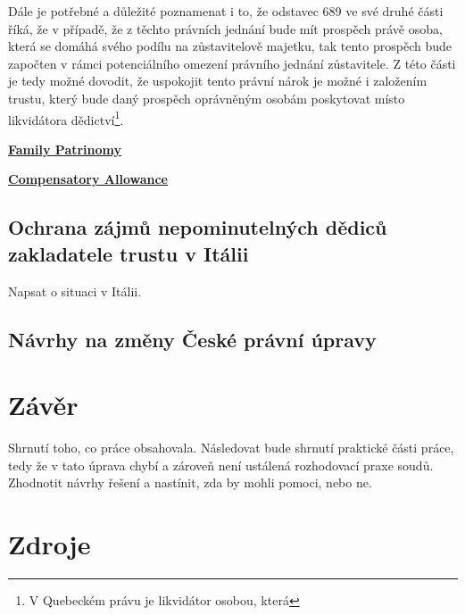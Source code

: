 \documentclass{article}
\begin{document}
Dále je potřebné a důležité poznamenat i to, že odstavec 689 ve své druhé části říká, že v případě, že z těchto právních jednání bude mít prospěch právě osoba, která se domáhá svého podílu na zůstavitelově majetku, tak tento prospěch bude započten v rámci potenciálního omezení právního jednání zůstavitele. Z této části je tedy možné dovodit, že uspokojit tento právní nárok je možné i založením trustu, který bude daný prospěch oprávněným osobám poskytovat místo likvidátora dědictví\footnote{V Quebeckém právu je likvidátor osobou, která}.

\underline{\textbf{Family Patrinomy}}

\underline{\textbf{Compensatory Allowance}}

\subsection{Ochrana zájmů nepominutelných dědiců zakladatele trustu v Itálii}

Napsat o situaci v Itálii.

\subsection{Návrhy na změny České právní úpravy}

\newpage

\section{Závěr}

Shrnutí toho, co práce obsahovala. Následovat bude shrnutí praktické části práce, tedy že v tato úprava chybí a zároveň není ustálená rozhodovací praxe soudů. Zhodnotit návrhy řešení a nastínit, zda by mohli pomoci, nebo ne.

\newpage
\thispagestyle{Contents}
\section*{Zdroje}
\setcounter{SecZdroje}{\thesection}
\addtocounter{SecZdroje}{1}
\printbibliography[type=misc,heading=subbibliography,title={Online zdroje}]
\printbibliography[type=book,heading=subbibliography,title={Knižní zdroje}]
\printbibliography[type=article,heading=subbibliography,title={Články}]
\printbibliography[type=proceedings,heading=subbibliography,title={Zákony}]	
\end{document}
